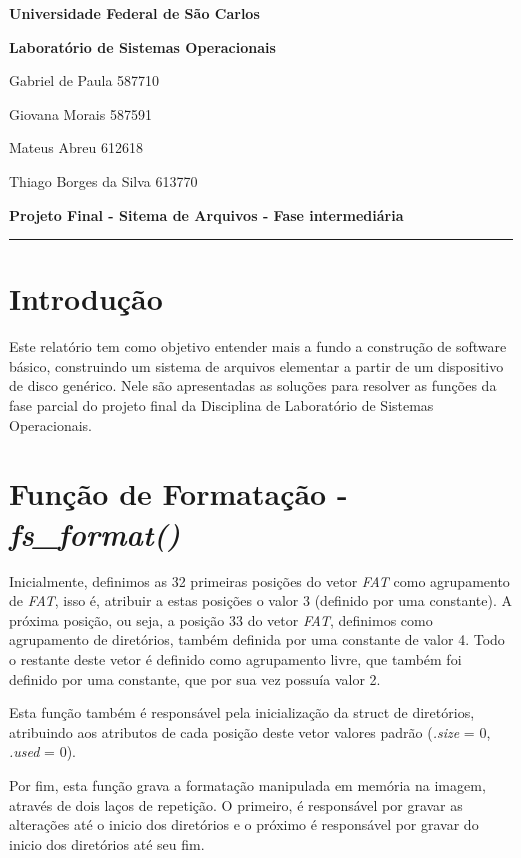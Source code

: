 \documentclass[11pt]{article}
\begin{document}
\begin{center}\textbf{Universidade Federal de São Carlos}\end{center}
\begin{center}\textbf{Laboratório de Sistemas Operacionais}\end{center}

\noindent Gabriel de Paula \hfill 587710

\noindent Giovana Morais \hfill 587591

\noindent Mateus Abreu \hfill 612618

\noindent Thiago Borges da Silva \hfill 613770

\noindent \textbf{Projeto Final - Sitema de Arquivos - Fase intermediária}

\noindent \rule{\linewidth}{1.5pt}

\section{Introdução}
Este relatório tem como objetivo entender mais a fundo a construção de software básico, construindo um sistema de arquivos elementar a partir de um dispositivo de disco genérico. Nele são apresentadas as soluções para resolver as funções da fase parcial do projeto final da Disciplina de Laboratório de Sistemas Operacionais.

\section{Função de Formatação - \textit{fs\_format()}}
\par
Inicialmente, definimos as 32 primeiras posições do vetor \textit{FAT} como agrupamento de \textit{FAT}, isso é, atribuir a estas posições o valor 3 (definido por uma constante). A próxima posição, ou seja, a posição 33 do vetor \textit{FAT}, definimos como agrupamento de diretórios, também definida por uma constante de valor 4. Todo o restante deste vetor é definido como agrupamento livre, que também foi definido por uma constante, que por sua vez possuía valor 2.
\par
Esta função também é responsável pela inicialização da struct de diretórios, atribuindo aos  atributos de cada posição deste vetor valores padrão (\textit{.size} = 0, \textit{.used} = 0).
\par
Por fim, esta função grava a formatação manipulada em memória na imagem, através de dois laços de repetição. O primeiro, é responsável por gravar as alterações até o inicio dos diretórios e o próximo é responsável por gravar do inicio dos diretórios até seu fim.
\end{document}
